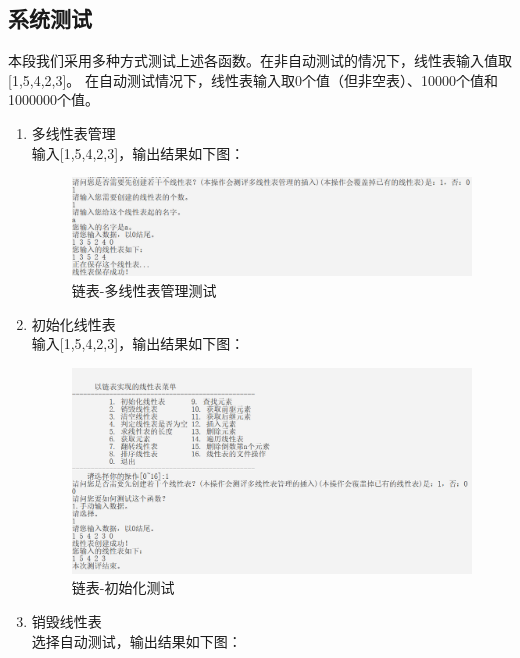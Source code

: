 \documentclass[supercite]{Experimental_Report}
\theoremstyle{definition}
\begin{document}
\subsection{系统测试}
本段我们采用多种方式测试上述各函数。在非自动测试的情况下，线性表输入值取[1,5,4,2,3]。
在自动测试情况下，线性表输入取0个值（但非空表）、10000个值和1000000个值。
	\begin{enumerate}
		\item 多线性表管理\\
		输入[1,5,4,2,3]，输出结果如下图：
		\begin{figure}[htb]
			\begin{center}
				\includegraphics[scale=0.60]{images/链表-多线性表管理.png}
				\caption{链表-多线性表管理测试}
				\label{fig1-2}
			\end{center}
		\end{figure}
		\item 初始化线性表\\
		输入[1,5,4,2,3]，输出结果如下图：
		\begin{figure}[htb]
			\begin{center}
				\includegraphics[scale=0.60]{images/链表-初始化.png}
				\caption{链表-初始化测试}
				\label{fig1-3}
			\end{center}
		\end{figure}
		\newpage
		\item 销毁线性表\\
		选择自动测试，输出结果如下图：
		\begin{figure}[htb]

\end{figure}
\end{enumerate}
\end{document}
